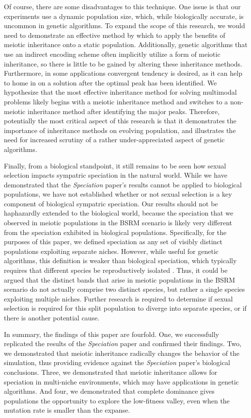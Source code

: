 \documentclass[conference]{IEEEtran}
\begin{document}
Of course, there are some disadvantages to this technique. One issue is that our experiments use a dynamic population size, which, while biologically accurate, is uncommon in genetic algorithms. To expand the scope of this research, we would need to demonstrate an effective method by which to apply the benefits of meiotic inheritance onto a static population. Additionally, genetic algorithms that use an indirect encoding scheme often implicitly utilize a form of meiotic inheritance, so there is little to be gained by altering these inheritance methods. Furthermore, in some applications convergent tendency is desired, as it can help to home in on a solution after the optimal peak has been identified. We hypothesize that the most effective inheritance method for solving multimodal problems likely begins with a meiotic inheritance method and switches to a non-meiotic inheritance method after identifying the major peaks. Therefore, potentially the most critical aspect of this research is that it demonstrates the importance of inheritance methods on evolving population, and illustrates the need for increased scrutiny of a rather under-appreciated aspect of genetic algorithms.

Finally, from a biological standpoint, it still remains to be seen how sexual selection impacts sympatric speciation in the natural world. While we have demonstrated that the \textit{Speciation} paper’s results cannot be applied to biological populations, we have not established whether or not sexual selection is a key component of biological sympatric speciation. Our results should not be haphazardly extended to the biological world, because the speciation that we observed in meiotic populations in the BSRM scenario is likely very different from the speciation exhibited in biological populations. Specifically, for the purposes of this paper, we defined speciation as any set of visibly distinct populations exploiting separate niches. However, while useful for genetic algorithms, this definition is weaker than biological speciation, which typically requires that different species be reproductively isolated \cite{TEXTBOOK}. Thus, it could be argued that the distinct bands that arise in meiotic populations in the BSRM scenario do not actually comprise two distinct species, but rather a single species exploiting multiple niches. Further research is required to determine if sexual selection is required for this split population to diverge into separate species, or if there is another potential cause.

In summary, the findings of this paper are fourfold. One, we successfully replicated the results of the \textit{Speciation} paper and confirmed their findings. Two, we demonstrated that meiotic inheritance radically changes the behavior of the simulation, thus providing evidence against the \textit{Speciation} paper's biological conclusions. Three, we demonstrated that meiotic inheritance allows for speciation in multi-niche environments, which may have applications in genetic algorithms. And four, we demonstrated that complete dominance gives populations the opportunity to explore the low-fitness valley, even when the mutation rate is smaller than the expanse. 
\end{document}
